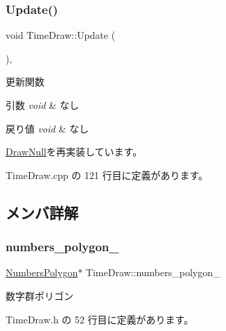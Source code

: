 \subsubsection{\texorpdfstring{Update()}{Update()}}
{\footnotesize\ttfamily void Time\+Draw\+::\+Update (\begin{DoxyParamCaption}{ }\end{DoxyParamCaption})\hspace{0.3cm}{\ttfamily [override]}, {\ttfamily [virtual]}}



更新関数 


\begin{DoxyParams}{引数}
{\em void} & なし \\
\hline
\end{DoxyParams}

\begin{DoxyRetVals}{戻り値}
{\em void} & なし \\
\hline
\end{DoxyRetVals}


\mbox{\hyperlink{class_draw_null_ad32a508d269de7eda8ad24ea72230464}{Draw\+Null}}を再実装しています。



 Time\+Draw.\+cpp の 121 行目に定義があります。



\subsection{メンバ詳解}
\mbox{\label{class_time_draw_a5debc3ca2af05073560a1a3a30426d14}} 
\subsubsection{\texorpdfstring{numbers\+\_\+polygon\+\_\+}{numbers\_polygon\_}}
{\footnotesize\ttfamily \mbox{\hyperlink{class_numbers_polygon}{Numbers\+Polygon}}$\ast$ Time\+Draw\+::numbers\+\_\+polygon\+\_\+\hspace{0.3cm}{\ttfamily [private]}}



数字群ポリゴン 



 Time\+Draw.\+h の 52 行目に定義があります。

